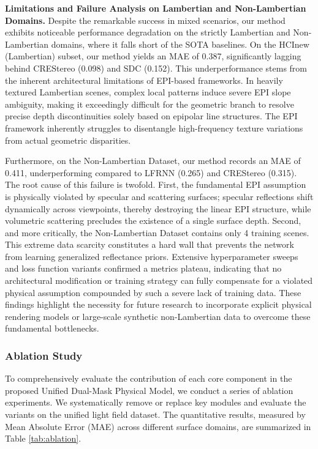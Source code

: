 \documentclass[lettersize,journal]{IEEEtran}
\begin{document}
\textbf{Limitations and Failure Analysis on Lambertian and Non-Lambertian Domains.} 
Despite the remarkable success in mixed scenarios, our method exhibits noticeable performance degradation on the strictly Lambertian and Non-Lambertian domains, where it falls short of the SOTA baselines. On the HCInew (Lambertian) subset, our method yields an MAE of 0.387, significantly lagging behind CREStereo \cite{crestereo} (0.098) and SDC \cite{sdc} (0.152). This underperformance stems from the inherent architectural limitations of EPI-based frameworks. In heavily textured Lambertian scenes, complex local patterns induce severe EPI slope ambiguity, making it exceedingly difficult for the geometric branch to resolve precise depth discontinuities solely based on epipolar line structures. The EPI framework inherently struggles to disentangle high-frequency texture variations from actual geometric disparities.

Furthermore, on the Non-Lambertian Dataset, our method records an MAE of 0.411, underperforming compared to LFRNN \cite{lfrnn} (0.265) and CREStereo \cite{crestereo} (0.315). The root cause of this failure is twofold. First, the fundamental EPI assumption is physically violated by specular and scattering surfaces; specular reflections shift dynamically across viewpoints, thereby destroying the linear EPI structure, while volumetric scattering precludes the existence of a single surface depth. Second, and more critically, the Non-Lambertian Dataset contains only 4 training scenes. This extreme data scarcity constitutes a hard wall that prevents the network from learning generalized reflectance priors. Extensive hyperparameter sweeps and loss function variants confirmed a metrics plateau, indicating that no architectural modification or training strategy can fully compensate for a violated physical assumption compounded by such a severe lack of training data. These findings highlight the necessity for future research to incorporate explicit physical rendering models or large-scale synthetic non-Lambertian data to overcome these fundamental bottlenecks.

\subsubsection{Ablation Study}

To comprehensively evaluate the contribution of each core component in the proposed Unified Dual-Mask Physical Model, we conduct a series of ablation experiments. We systematically remove or replace key modules and evaluate the variants on the unified light field dataset. The quantitative results, measured by Mean Absolute Error (MAE) across different surface domains, are summarized in Table \ref{tab:ablation}.
\end{document}
